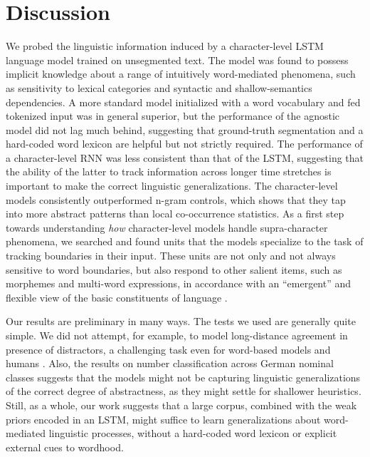 \section{Discussion}
\label{sec:discussion}

We probed the linguistic information induced by a character-level LSTM
language model trained on unsegmented text. The model was found to
possess implicit knowledge about a range of intuitively word-mediated
phenomena, such as sensitivity to lexical categories and syntactic and
shallow-semantics dependencies. A more standard model initialized with
a word vocabulary and fed tokenized input was in general superior, but
the performance of the agnostic model did not lag much behind,
suggesting that ground-truth segmentation and a hard-coded word
lexicon are helpful but not strictly required. The performance of a
character-level RNN was less consistent than that of the LSTM,
suggesting that the ability of the latter to track information across
longer time stretches is important to make the correct linguistic
generalizations. The character-level models consistently outperformed
n-gram controls, which shows that they tap into more
abstract patterns than local co-occurrence statistics. As a first step
towards understanding \emph{how} character-level models handle
supra-character phenomena, we searched and found units that
the models specialize to the task of tracking boundaries in their
input. These units are not only and not always sensitive to word
boundaries, but also respond to other salient items, such as morphemes
and multi-word expressions, in accordance with an ``emergent'' and
flexible view of the basic constituents of language
\cite{Schiering:etal:2010}.

Our results are preliminary in many ways. The tests we used are
generally quite simple. We did not attempt, for example, to model
long-distance agreement in presence of distractors, a challenging task
even for word-based models and humans
\citep{Gulordava:etal:2018}. Also, the results on number
classification across German nominal classes suggests that the models
might not be capturing linguistic generalizations of the correct
degree of abstractness, as they might settle for shallower
heuristics. Still, as a whole, our work suggests that a large
corpus, combined with the weak priors encoded in an LSTM, might
suffice to learn generalizations about word-mediated linguistic
processes, without a hard-coded word lexicon or explicit external cues
to wordhood.

